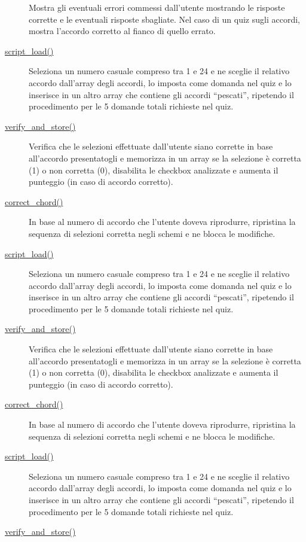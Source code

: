 \begin{description}
Mostra gli eventuali errori commessi dall'utente mostrando le risposte
corrette e le eventuali risposte sbagliate. Nel caso di un quiz sugli
accordi, mostra l'accordo corretto al fianco di quello errato.
\item[{ \protect\hyperlink{script_load}{script\_load()} }]
Seleziona un numero casuale compreso tra 1 e 24 e ne sceglie il relativo
accordo dall'array degli accordi, lo imposta come domanda nel quiz e lo
inserisce in un altro array che contiene gli accordi ``pescati'',
ripetendo il procedimento per le 5 domande totali richieste nel quiz.
\item[{ \protect\hyperlink{verify_and_store}{verify\_and\_store()} }]
Verifica che le selezioni effettuate dall'utente siano corrette in base
all'accordo presentatogli e memorizza in un array se la selezione è
corretta (1) o non corretta (0), disabilita le checkbox analizzate e
aumenta il punteggio (in caso di accordo corretto).
\item[{ \protect\hyperlink{correct_chord}{correct\_chord()} }]
In base al numero di accordo che l'utente doveva riprodurre, ripristina
la sequenza di selezioni corretta negli schemi e ne blocca le modifiche.
\item[{ \protect\hyperlink{script_load}{script\_load()} }]
Seleziona un numero casuale compreso tra 1 e 24 e ne sceglie il relativo
accordo dall'array degli accordi, lo imposta come domanda nel quiz e lo
inserisce in un altro array che contiene gli accordi ``pescati'',
ripetendo il procedimento per le 5 domande totali richieste nel quiz.
\item[{ \protect\hyperlink{verify_and_store}{verify\_and\_store()} }]
Verifica che le selezioni effettuate dall'utente siano corrette in base
all'accordo presentatogli e memorizza in un array se la selezione è
corretta (1) o non corretta (0), disabilita le checkbox analizzate e
aumenta il punteggio (in caso di accordo corretto).
\item[{ \protect\hyperlink{correct_chord}{correct\_chord()} }]
In base al numero di accordo che l'utente doveva riprodurre, ripristina
la sequenza di selezioni corretta negli schemi e ne blocca le modifiche.
\item[{ \protect\hyperlink{script_load}{script\_load()} }]
Seleziona un numero casuale compreso tra 1 e 24 e ne sceglie il relativo
accordo dall'array degli accordi, lo imposta come domanda nel quiz e lo
inserisce in un altro array che contiene gli accordi ``pescati'',
ripetendo il procedimento per le 5 domande totali richieste nel quiz.
\item[{ \protect\hyperlink{verify_and_store}{verify\_and\_store()} }]

\end{description}
